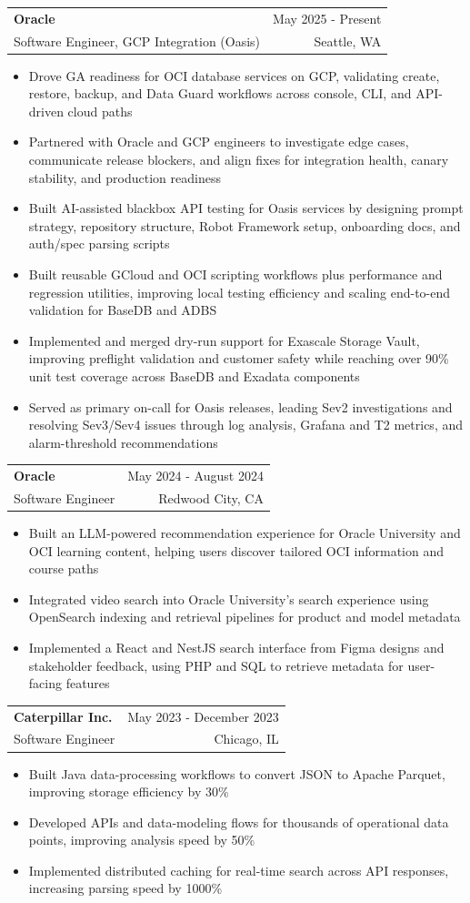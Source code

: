 \documentclass[letterpaper,11pt]{article}
\makeatletter
\newcommand{\resumeItem}[1]{
  \item\small{
    {#1 \vspace{-1pt}}
  }
}
\newcommand{\resumeSubheading}[4]{
  \vspace{-2pt}\item
    \begin{tabular*}{0.97\textwidth}[t]{l@{\extracolsep{\fill}}r}
      \textbf{#1} & #2 \\
      {\small#3} & {\small #4} \\
    \end{tabular*}\vspace{-7pt}
}
\newcommand{\resumeItemListStart}{\begin{itemize}[leftmargin=0.18in,itemsep=1pt,topsep=2pt]}
\newcommand{\resumeItemListEnd}{\end{itemize}\vspace{-5pt}}
\makeatother
\begin{document}
    \resumeSubheading
  {Oracle}{May 2025 - Present}
  {Software Engineer, GCP Integration (Oasis)}{Seattle, WA}
  \resumeItemListStart
    \resumeItem{Drove GA readiness for OCI database services on GCP, validating create, restore, backup, and Data Guard workflows across console, CLI, and API-driven cloud paths}
    \resumeItem{Partnered with Oracle and GCP engineers to investigate edge cases, communicate release blockers, and align fixes for integration health, canary stability, and production readiness}
    \resumeItem{Built AI-assisted blackbox API testing for Oasis services by designing prompt strategy, repository structure, Robot Framework setup, onboarding docs, and auth/spec parsing scripts}
    \resumeItem{Built reusable GCloud and OCI scripting workflows plus performance and regression utilities, improving local testing efficiency and scaling end-to-end validation for BaseDB and ADBS}
    \resumeItem{Implemented and merged dry-run support for Exascale Storage Vault, improving preflight validation and customer safety while reaching over 90\% unit test coverage across BaseDB and Exadata components}
    \resumeItem{Served as primary on-call for Oasis releases, leading Sev2 investigations and resolving Sev3/Sev4 issues through log analysis, Grafana and T2 metrics, and alarm-threshold recommendations}
  \resumeItemListEnd

    \resumeSubheading
      {Oracle}{May 2024 - August 2024}
      {Software Engineer}{Redwood City, CA}
      \resumeItemListStart
        \resumeItem{Built an LLM-powered recommendation experience for Oracle University and OCI learning content, helping users discover tailored OCI information and course paths}
        \resumeItem{Integrated video search into Oracle University's search experience using OpenSearch indexing and retrieval pipelines for product and model metadata}
        \resumeItem{Implemented a React and NestJS search interface from Figma designs and stakeholder feedback, using PHP and SQL to retrieve metadata for user-facing features}
      \resumeItemListEnd

    \resumeSubheading
      {Caterpillar Inc.}{May 2023 - December 2023}
      {Software Engineer}{Chicago, IL}
      \resumeItemListStart
        \resumeItem{Built Java data-processing workflows to convert JSON to Apache Parquet, improving storage efficiency by 30\%}
        \resumeItem{Developed APIs and data-modeling flows for thousands of operational data points, improving analysis speed by 50\%}
        \resumeItem{Implemented distributed caching for real-time search across API responses, increasing parsing speed by 1000\%}
      \resumeItemListEnd
\end{document}
